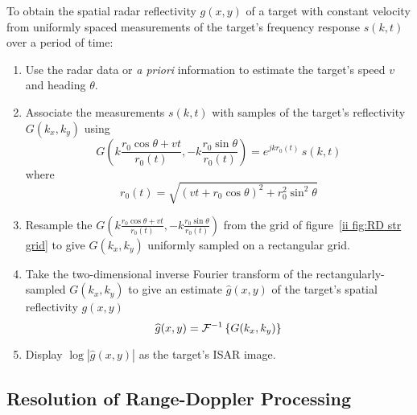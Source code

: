 \begin{algorithm}
\label{ii alg:RD straight line}\mbox{}\par

To obtain the spatial radar reflectivity $g(x,y)$ of a target with constant
velocity from uniformly spaced measurements of the target's frequency
response $s(k,t)$ over a period of time:
\begin{enumerate}
\item Use the radar data or {\em a priori\/} information to estimate the 
target's speed $v$ and heading $\theta$.

\item Associate the measurements $s(k,t)$ with samples of the target's
reflectivity $G(k_x,k_y)$ using
\begin{equation}
G\left(k\frac{r_0\cos\theta+vt}{r_0(t)},-k\frac{r_0\sin\theta}{r_0(t)}\right)
=e^{jkr_0(t)}\,s(k,t)
\end{equation}
where
\begin{equation}
r_0(t)=\sqrt{(vt+r_0\cos\theta)^2+r_0^2\sin^2\theta}
\end{equation}

\item Resample the $G\left(k\frac{r_0\cos\theta+vt}{r_0(t)},
-k\frac{r_0\sin\theta}{r_0(t)}\right)$ from the grid of
figure~\ref{ii fig:RD str grid} to give $G(k_x,k_y)$ uniformly 
sampled on a rectangular grid.

\item Take the two-dimensional inverse Fourier transform of the
rectangularly-sampled $G(k_x,k_y)$ to give an estimate $\widehat{g}(x,y)$
of the target's spatial reflectivity $g(x,y)$
\begin{equation}
\widehat{g}(x,y)={\cal F}^{-1}\left\{G(k_x,k_y)\right\}
\end{equation}

\item Display $\log\left|\widehat{g}(x,y)\right|$ as the target's ISAR image.

\end{enumerate}
\end{algorithm}

\subsection{Resolution of Range-Doppler Processing}

